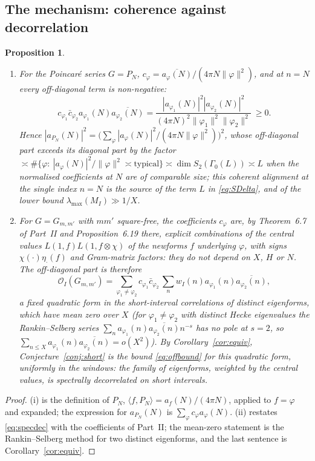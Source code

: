 \documentclass[11pt]{amsart}
\newtheorem{proposition}[theorem]{Proposition}
\theoremstyle{remark}
\begin{document}
\subsection{The mechanism: coherence against decorrelation}
\begin{proposition}\label{prop:mechanism}
\begin{enumerate}[label=\textup{(\roman*)},leftmargin=2.2em]
\item For the Poincar\'e series $G=P_N$, $c_\varphi=\overline{a_\varphi(N)}/(4\pi N\|\varphi\|^2)$, and at $n=N$ every off-diagonal term is non-negative:
\[
c_{\varphi_1}\bar c_{\varphi_2}a_{\varphi_1}(N)\overline{a_{\varphi_2}(N)}=\frac{|a_{\varphi_1}(N)|^2|a_{\varphi_2}(N)|^2}{(4\pi N)^2\|\varphi_1\|^2\|\varphi_2\|^2}\ \ge0 .
\]
Hence $|a_{P_N}(N)|^2=\bigl(\sum_\varphi|a_\varphi(N)|^2/(4\pi N\|\varphi\|^2)\bigr)^2$, whose off-diagonal part exceeds its diagonal part by the factor $\asymp\#\{\varphi:\ |a_\varphi(N)|^2/\|\varphi\|^2\asymp\text{typical}\}\asymp\dim S_2(\Gamma_0(L))\asymp L$ when the normalised coefficients at $N$ are of comparable size; this coherent alignment at the single index $n=N$ is the source of the term $L$ in \eqref{eq:SDelta}, and of the lower bound $\lambda_{\max}(M_I)\gg1/X$.
\item For $G=G_{m,m'}$ with $mm'$ square-free, the coefficients $c_\varphi$ are, by Theorem~6.7 of Part~II and Proposition~6.19 there, explicit combinations of the central values $L(1,f)L(1,f\otimes\chi)$ of the newforms $f$ underlying $\varphi$, with signs $\chi(\cdot)\eta_\cdot(f)$ and Gram-matrix factors: they do not depend on $X$, $H$ or $N$. The off-diagonal part is therefore
\[
\mathcal O_I(G_{m,m'})=\sum_{\varphi_1\ne\varphi_2}c_{\varphi_1}\bar c_{\varphi_2}\,\sum_nw_I(n)a_{\varphi_1}(n)\overline{a_{\varphi_2}(n)},
\]
a fixed quadratic form in the short-interval correlations of distinct eigenforms, which have mean zero over $X$ (for $\varphi_1\ne\varphi_2$ with distinct Hecke eigenvalues the Rankin--Selberg series $\sum_na_{\varphi_1}(n)\overline{a_{\varphi_2}(n)}n^{-s}$ has no pole at $s=2$, so $\sum_{n\le X}a_{\varphi_1}(n)\overline{a_{\varphi_2}(n)}=o(X^2)$). By Corollary~\ref{cor:equiv}, Conjecture~\ref{conj:short} is the bound \eqref{eq:offbound} for this quadratic form, uniformly in the windows: the family of eigenforms, weighted by the central values, is spectrally decorrelated on short intervals.
\end{enumerate}
\end{proposition}
\begin{proof}
(i) is the definition of $P_N$, $\langle f,P_N\rangle=a_f(N)/(4\pi N)$, applied to $f=\varphi$ and expanded; the expression for $a_{P_N}(N)$ is $\sum_\varphi c_\varphi a_\varphi(N)$. (ii) restates \eqref{eq:specdec} with the coefficients of Part~II; the mean-zero statement is the Rankin--Selberg method for two distinct eigenforms, and the last sentence is Corollary~\ref{cor:equiv}.
\end{proof}
\end{document}
